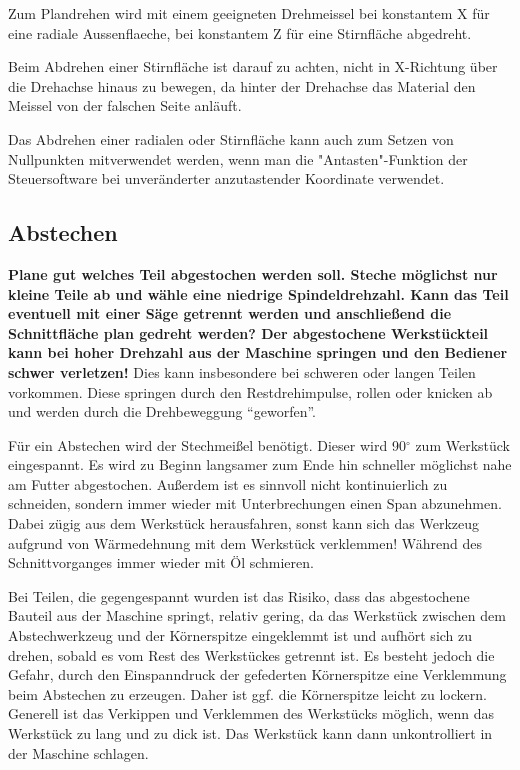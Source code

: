 \documentclass{\basedir/fablab-document}
\begin{document}
Zum Plandrehen wird mit einem geeigneten Drehmeissel bei konstantem X für eine radiale Aussenflaeche, bei konstantem Z für eine Stirnfläche abgedreht.

Beim Abdrehen einer Stirnfläche ist darauf zu achten, nicht in X-Richtung über die Drehachse hinaus zu bewegen, da hinter der Drehachse das Material den Meissel von der falschen Seite anläuft.

Das Abdrehen einer radialen oder Stirnfläche kann auch zum Setzen von Nullpunkten mitverwendet werden, wenn man die "Antasten"-Funktion der Steuersoftware bei unveränderter anzutastender Koordinate verwendet.

\subsection{Abstechen}

\textbf{Plane gut welches Teil abgestochen werden soll. Steche möglichst nur kleine Teile ab und wähle eine niedrige Spindeldrehzahl. Kann das Teil eventuell mit einer Säge getrennt werden und anschließend die Schnittfläche plan gedreht werden? Der abgestochene Werkstückteil kann bei hoher Drehzahl aus der Maschine springen und den Bediener schwer verletzen!} Dies kann insbesondere bei schweren oder langen Teilen vorkommen. Diese springen durch den Restdrehimpulse, rollen oder knicken ab und werden durch die Drehbeweggung \enquote{geworfen}.

Für ein Abstechen wird der Stechmeißel benötigt.
Dieser wird 90$^\circ$ zum Werkstück eingespannt.
Es wird zu Beginn langsamer zum Ende hin schneller möglichst nahe am Futter abgestochen.
Außerdem ist es sinnvoll nicht kontinuierlich zu schneiden, sondern immer wieder mit Unterbrechungen einen Span abzunehmen.
Dabei zügig aus dem Werkstück herausfahren, sonst kann sich das Werkzeug aufgrund von Wärmedehnung mit dem Werkstück verklemmen!
Während des Schnittvorganges immer wieder mit Öl schmieren.

Bei Teilen, die gegengespannt wurden ist das Risiko, dass das abgestochene Bauteil aus der Maschine springt, relativ gering, da das Werkstück zwischen dem Abstechwerkzeug und der Körnerspitze eingeklemmt ist und aufhört sich zu drehen, sobald es vom Rest des Werkstückes getrennt ist. Es besteht jedoch die Gefahr, durch den Einspanndruck der gefederten Körnerspitze eine Verklemmung beim Abstechen zu erzeugen. Daher ist ggf. die Körnerspitze leicht zu lockern. Generell ist das Verkippen und Verklemmen des Werkstücks möglich, wenn das Werkstück zu lang und zu dick ist. Das Werkstück kann dann unkontrolliert in der Maschine schlagen.
\end{document}
